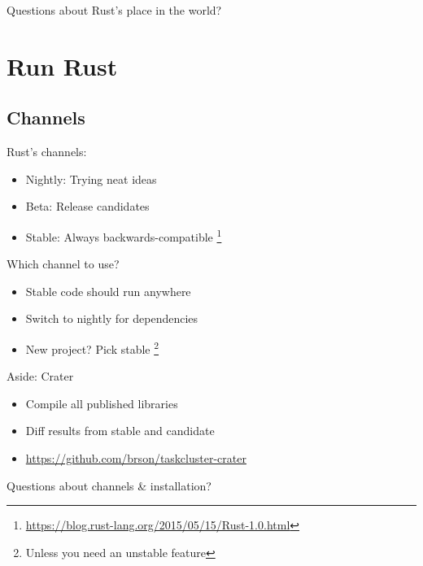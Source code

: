 \documentclass[aspectratio=169]{beamer}
\begin{document}
\begin{frame}
    \hfill Questions about Rust's place in the world?
\end{frame}

\section{Run Rust}

\subsection{Channels}

\begin{frame}
    Rust's channels:
    \begin{itemize}
        \item Nightly: Trying neat ideas
        \item Beta: Release candidates
        \item Stable: Always backwards-compatible \footnote{\url{https://blog.rust-lang.org/2015/05/15/Rust-1.0.html}}
    \end{itemize}
\end{frame}

\begin{frame}
    Which channel to use?
    \begin{itemize}
        \item Stable code should run anywhere
        \item Switch to nightly for dependencies
        \item New project? Pick stable \footnote{Unless you need an
              unstable feature}
    \end{itemize}
\end{frame}

\begin{frame}
    Aside: Crater
    \begin{itemize}
        \item Compile all published libraries
        \item Diff results from stable and candidate
        \item \url{https://github.com/brson/taskcluster-crater}
    \end{itemize}
\end{frame}

\begin{frame}
    \hfill Questions about channels \& installation?
\end{frame}
\end{document}
